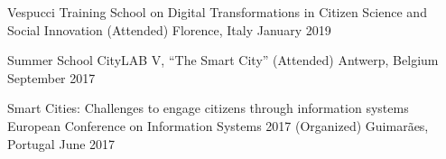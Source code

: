 

\begin{cventries}


  \cventry
    {} %
    {Vespucci Training School on Digital Transformations in Citizen Science and Social Innovation (Attended)} %
    {Florence, Italy} %
    {January 2019} %
    {}

\vspace{-4mm}    
  \cventry
    {} %
    {Summer School CityLAB V, “The Smart City” (Attended)} %
    {Antwerp, Belgium} %
    {September 2017} %
    {}
    
\vspace{-4mm}
  \cventry
    {Smart Cities: Challenges to engage citizens through information systems} %
    {European Conference on Information Systems 2017 (Organized)} %
    {Guimarães, Portugal} %
    {June 2017} %
    {}
  
\vspace{-4mm}    
\end{cventries}
